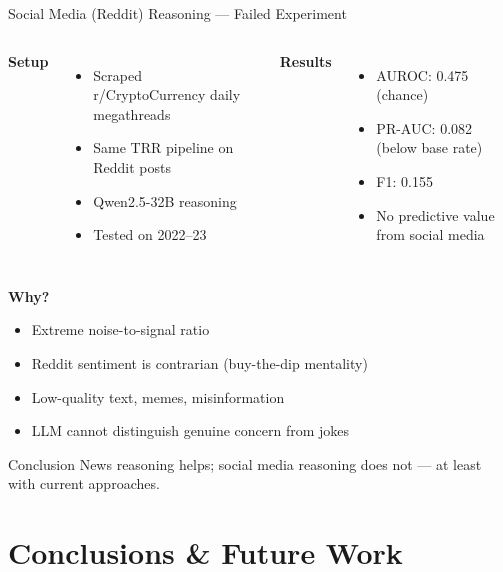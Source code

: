 \documentclass[10pt,aspectratio=169]{beamer}
\begin{document}
\begin{frame}{Social Media (Reddit) Reasoning — Failed Experiment}
  \begin{columns}[t]
    \textbf{Setup}
    \begin{itemize}
      \item Scraped r/CryptoCurrency daily megathreads
      \item Same TRR pipeline on Reddit posts
      \item Qwen2.5-32B reasoning
      \item Tested on 2022--23
    \end{itemize}
    \textbf{Results}
    \begin{itemize}
      \item AUROC: 0.475 (chance)
      \item PR-AUC: 0.082 (below base rate)
      \item F1: 0.155
      \item \alert{No predictive value from social media}
    \end{itemize}
  \end{columns}
  
  \vspace{0.3cm}
  \textbf{Why?}
  \begin{itemize}
    \item Extreme noise-to-signal ratio
    \item Reddit sentiment is contrarian (buy-the-dip mentality)
    \item Low-quality text, memes, misinformation
    \item LLM cannot distinguish genuine concern from jokes
  \end{itemize}
  
  \begin{alertblock}{Conclusion}
    News reasoning helps; social media reasoning does not — at least with current approaches.
  \end{alertblock}
\end{frame}

\section{Conclusions \& Future Work}
\end{document}
